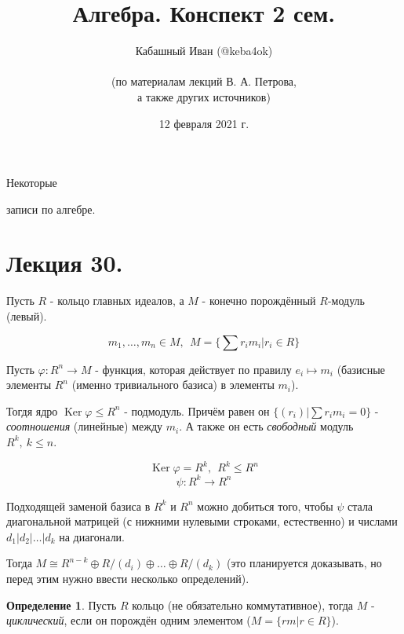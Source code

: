 \documentclass[a4paper,100pt]{article}
\title{Алгебра. Конспект 2 сем.}
\author{Кабашный Иван (@keba4ok)\\ \\ (по материалам лекций В. А. Петрова,\\ а также других источников)}
\date{12 февраля 2021 г.}
\theoremstyle{indented}
\theoremstyle{definition}
\newtheorem{defn}{Определение}
\theoremstyle{remark}
\DeclareMathOperator{\Ker}{Ker}
\begin{document}
\newcommand{\resetexlcounters}{%
  \setcounter{exl}{0}%
} 

\newcommand{\resetremarkcounters}{%
  \setcounter{remark}{0}%
} 

\newcommand{\reseconscounters}{%
  \setcounter{cons}{0}%
} 

\newcommand{\resetall}{%
    \resetexlcounters
    \resetremarkcounters
    \reseconscounters%
}

\maketitle 

\newpage

\hypertarget{t1}{Некоторые} записи по алгебре.
\tableofcontents

\newpage


\section{Лекция 30.}

Пусть $R$ - кольцо главных идеалов, а $M$ - конечно порождённый $R$-модуль (левый). 

\[
    m_1, \ldots, m_n\in M, \:\:M=\{\sum r_im_i \vert r_i\in R\}
\]

Пусть $\varphi: R^n\rightarrow M$ - функция, которая действует по правилу $e_i\mapsto m_i$ (базисные элементы $R^n$ (именно тривиального базиса) в элементы $m_i$). \

Тогдя ядро $\Ker \varphi \leq R^n$ - подмодуль. Причём равен он $\{(r_i)\vert \sum r_im_i=0\}$ - \textit{соотношения} (линейные) между $m_i$. А также он есть \textit{свободный} модуль $R^k, \: k\leq n$. 

\[
    \Ker \varphi =R^k, \:\: R^k\leq R^n 
\]
\[
    \psi: R^k\rightarrow R^n
\]

Подходящей заменой базиса в $R^k$ и $R^n$ можно добиться того, чтобы $\psi$ стала диагональной матрицей (с нижними нулевыми строками, естественно) и числами $d_1\vert d_2\vert \ldots\vert d_k$ на диагонали.

Тогда $M\cong R^{n-k}\oplus R/(d_i)\oplus\ldots \oplus R/(d_k)$ (это планируется доказывать, но перед этим нужно ввести несколько определений).\ 

\begin{defn} 
    Пусть $R$ кольцо (не обязательно коммутативное), тогда $M$ - \textit{циклический}, если он порождён одним элементом ($M=\{rm\vert r\in R\}$).
\end{defn}
\end{document}
